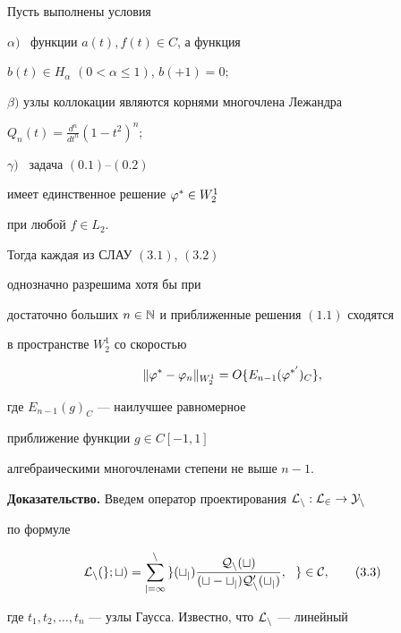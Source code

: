 \begin{thm}


Пусть выполнены условия





$\alpha)$ \ функции $a(t), f(t)\in C$, а функция


$b(t)\in H_{\alpha}$ $(0<\alpha\le 1)$, $b(+1)=0;$





$\beta)$ узлы коллокации являются корнями многочлена Лежандра     


$Q_n(t)=\frac{d^n}{dt^n}(1-t^2)^n;$





$\gamma)$ \ задача $(0.1)$--$(0.2)$


имеет единственное решение $\varphi^*\in W^1_2$ 


при любой $f\in L_2.$





\noindent{}Тогда каждая из СЛАУ $(3.1)$, $(3.2)$


однозначно разрешима хотя бы при


достаточно больших $n\in\Bbb N$ и приближенные решения $(1.1)$ сходятся 


в пространстве $W^1_2$ со скоростью


$$


\|\vp^*-\vp_n\|_{W^1_2}=O\{E_{n-1}(\vp^{*'})_C\},


$$


где $E_{n-1}(g)_C$ --- наилучшее равномерное 


приближение функции $g\in C[-1,1]$ 


алгебраическими многочленами степени не выше $n-1$.


\end{thm}





{\bf Доказательство.} Введем оператор проектирования $\cal L_n:L_2\to Y_n$ 


по формуле


\begin{equation}


\rL_n(g;t)=\sum_{j=1}^{n}g(t_j)\frac{Q_n(t)}{(t-t_j)Q'_n(t_j)},\ \ g\in C,


\tag{3.3}


\end{equation}


где $t_1,t_2,\dotsc,t_n$ --- узлы Гаусса. Известно, что $\cal L_n$ --- линейный 


